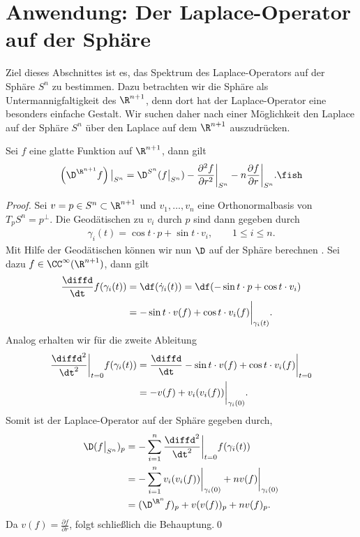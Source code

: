 \documentclass[%
	paper=a5,%
	fleqn,%
	DIV=18,%
	BCOR=0mm,
	fontsize=11pt,
	titlepage=false,%
	bibliography=totoc,
	DIV=18,%
	twoside=true,
	pdftitle=Riemannsche Geometrie,
	pdfauthor=Uwe Semmelmann,
	numbers=noendperiod]%
	{scrbook}
\begin{document}
\section{Anwendung: Der Laplace-Operator auf der Sphäre}

Ziel dieses Abschnittes ist es, das Spektrum des Laplace-Operators auf der Sphäre $S^n$ zu bestimmen. Dazu betrachten wir die Sphäre als Untermannigfaltigkeit des $\R^{n+1}$, denn dort hat der Laplace-Operator eine besonders einfache Gestalt.
Wir suchen daher nach einer Möglichkeit den Laplace auf der Sphäre $S^n$ über den Laplace auf dem $\R^{n+1}$ auszudrücken.

\begin{prop}
Sei $f$ eine glatte Funktion auf $\R^{n+1}$, dann gilt
\begin{align*}
\left(\D^{\R^{n+1}}f\right)\big|_{S^n}  = 
\D^{S^n}(f\big|_{S^n}) - \frac{\partial^2 f}{\partial r^2}\bigg|_{S^n} - 
n\frac{\partial f}{\partial r}\bigg|_{S^n}.\fish
\end{align*}
\end{prop}

\begin{proof}
Sei $v=p\in S^n\subset\R^{n+1}$ und $v_{1},\ldots,v_{n}$ eine Orthonormalbasis von $T_{p}S^n = p^\bot$. Die Geodätischen zu $v_{i}$ durch $p$ sind dann gegeben durch
\begin{align*}
\gamma_{i}(t) = \cos t \cdot p + \sin t \cdot v_{i},\qquad 1\le i\le n.
\end{align*}
Mit Hilfe der Geodätischen können wir nun $\D$ auf der Sphäre berechnen . Sei dazu $f\in\CC^\infty(\R^{n+1})$, dann gilt
\begin{align*}
\frac{\diffd}{\dt} f(\gamma_{i}(t)) &= \df(\dot\gamma_{i}(t)) = 
\df(-\sin t\cdot p + \cos t \cdot v_{i})\\
&= -\sin t \cdot v(f) + \cos t \cdot v_{i}(f)\bigg|_{\gamma_{i}(t)}.
\end{align*}
Analog erhalten wir für die zweite Ableitung
\begin{align*}
\frac{\diffd^2}{\dt^2}\bigg|_{t=0} f(\gamma_{i}(t)) &=
\frac{\diffd}{\dt}
-\sin t \cdot v(f) + \cos t \cdot v_{i}(f)\bigg|_{t=0}\\
&= -v(f) + v_{i}(v_{i}(f))\bigg|_{\gamma_{i}(0)}.
\end{align*}
Somit ist der Laplace-Operator auf der Sphäre gegeben durch,
\begin{align*}
\D(f\big|_{S^n})_{p} &=
-\sum_{i=1}^n 
\frac{\diffd^2}{\dt^2}\bigg|_{t=0} f(\gamma_{i}(t))\\
&= -\sum_{i=1}^n v_{i}(v_{i}(f))\bigg|_{\gamma_{i}(0)} + n v(f)\bigg|_{\gamma_{i}(0)}\\
&= (\D^{\R^n} f)_{p} + v(v(f))_{p} + nv(f)_{p}.
\end{align*}
Da $v(f) = \frac{\partial f}{\partial r}$, folgt schließlich die Behauptung.\qed
\end{proof}
\end{document}
